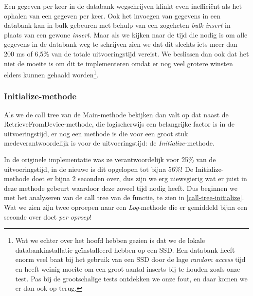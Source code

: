 Een gegeven per keer in de databank wegschrijven klinkt even inefficiënt als het ophalen van een gegeven per keer.
Ook het invoegen van gegevens in een databank kan in bulk gebeuren met behulp van een zogeheten \textit{bulk insert} in plaats van een gewone \textit{insert}.
Maar als we kijken naar de tijd die nodig is om alle gegevens in de databank weg te schrijven zien we dat
dit slechts iets meer dan 200 ms of 6,5\% van de totale uitvoeringstijd vereist.
We beslissen dan ook dat het niet de moeite is om dit te implementeren omdat er nog veel grotere winsten elders kunnen gehaald worden\footnote{
	Wat we echter over het hoofd hebben gezien is dat we de lokale databankinstallatie geïnstalleerd hebben op een SSD.
	Een databank heeft enorm veel baat bij het gebruik van een SSD door de lage \textit{random access} tijd en heeft weinig moeite om een groot aantal inserts bij te houden zoals onze test.
	Pas bij de grootschalige tests ontdekken we onze fout, en daar komen we er dan ook op terug.
}.


\subsubsection{Initialize-methode}

Als we de call tree van de Main-methode bekijken dan valt op dat naast de RetrieveFromDevice-methode,
die logischerwijs een belangrijke factor is in de uitvoeringstijd,
er nog een methode is die voor een groot stuk medeverantwoordelijk is voor de uitvoeringstijd: de \textit{Initialize}-methode.

In de originele implementatie was ze verantwoordelijk voor 25\% van de uitvoeringstijd, in de nieuwe is dit opgelopen tot bijna 56\%!
De Initialize-methode doet er bijna 2 seconden over, dus zijn we erg niewsgierig wat er juist in deze methode gebeurt waardoor deze zoveel tijd nodig heeft.
Dus beginnen we met het analyseren van de call tree van de functie, te zien in \cref{call-tree-initialize}.
Wat we zien zijn twee oproepen naar een \emph{Log}-methode die er gemiddeld bijna een seconde over doet \emph{per oproep}! %

